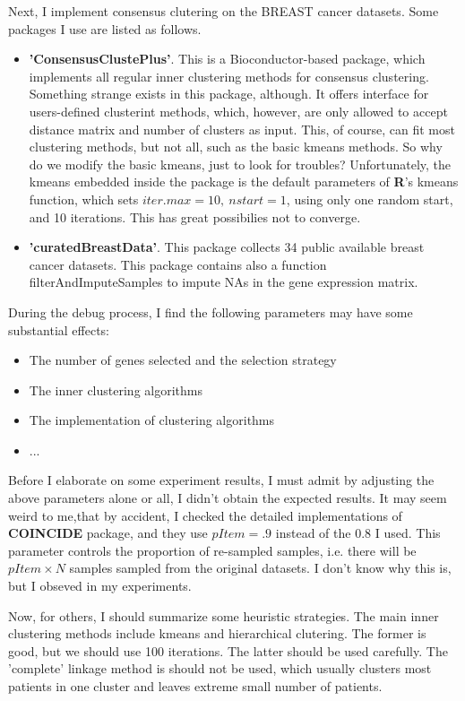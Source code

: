 \documentclass[12pt]{article}
\begin{document}
 Next, I implement consensus clutering on the BREAST cancer datasets. Some
 packages I use are listed as follows.
 \begin{itemize}
 \item {\bf \color{blue}'ConsensusClustePlus'}. This is a Bioconductor-based package, which
   implements all regular inner clustering methods for consensus clustering.
   Something strange exists in this package, although. It offers
   interface for users-defined clusterint methods, which, however, are only
   allowed to accept distance matrix and number of clusters as input. This, of
   course, can fit most clustering methods, but not all, such as the basic
   kmeans methods. So why do we modify the basic kmeans, just to look for
   troubles? Unfortunately, the kmeans embedded inside the package is the
   default parameters of {\bf R}'s kmeans function, which sets $iter.max=10,\
   nstart=1$, using only one random start, and 10 iterations. This has great
   possibilies not to converge.
 \item {\bf\color{blue}'curatedBreastData'}. This package collects 34 public
   available breast cancer datasets. This package contains also a function
   {\color{blue}filterAndImputeSamples } to impute NAs in the gene expression matrix.
 \end{itemize}

During the debug process, I find the following parameters may have some
substantial effects:
\begin{itemize}
\item The number of genes selected and the selection strategy
\item The inner clustering algorithms
\item The implementation of clustering algorithms
\item ...
\end{itemize}
Before I elaborate on some experiment results, I must admit by adjusting the
above parameters alone or all, I didn't obtain the expected results. It may seem
weird to me,that by accident, I checked the detailed implementations of {\bf
  \color{blue}COINCIDE} package, and they use $pItem=.9$ instead of the $0.8$ I
used. This parameter controls the proportion of re-sampled samples, i.e. there
will be $pItem \times N$ samples sampled from the original datasets. I don't
know why this is, but I obseved in my experiments.

Now, for others, I should summarize some heuristic strategies. The main inner
clustering methods include kmeans and hierarchical clutering. The former is
good, but we should use 100 iterations. The latter should be used carefully. The
'complete' linkage method is should not be used, which usually clusters most
patients in one cluster and leaves extreme small number of patients.
\end{document}
